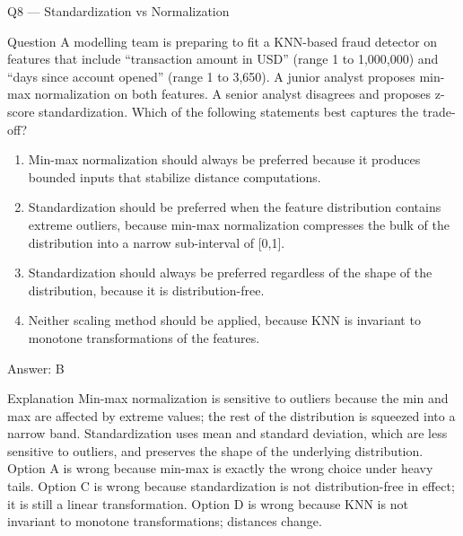 \documentclass[aspectratio=169,8pt]{beamer}
\begin{document}
	\begin{frame}{Q8 --- Standardization vs Normalization}
		\begin{block}{Question}
			A modelling team is preparing to fit a KNN-based fraud detector on features that include ``transaction amount in USD'' (range 1 to 1,000,000) and ``days since account opened'' (range 1 to 3,650). A junior analyst proposes min-max normalization on both features. A senior analyst disagrees and proposes z-score standardization. Which of the following statements best captures the trade-off?
		\end{block}
		\begin{enumerate}
			\item Min-max normalization should always be preferred because it produces bounded inputs that stabilize distance computations.
			\item Standardization should be preferred when the feature distribution contains extreme outliers, because min-max normalization compresses the bulk of the distribution into a narrow sub-interval of [0,1].
			\item Standardization should always be preferred regardless of the shape of the distribution, because it is distribution-free.
			\item Neither scaling method should be applied, because KNN is invariant to monotone transformations of the features.
		\end{enumerate}
		\begin{exampleblock}{Answer: B}\end{exampleblock}
		\begin{block}{Explanation}
			Min-max normalization is sensitive to outliers because the min and max are affected by extreme values; the rest of the distribution is squeezed into a narrow band. Standardization uses mean and standard deviation, which are less sensitive to outliers, and preserves the shape of the underlying distribution. Option A is wrong because min-max is exactly the wrong choice under heavy tails. Option C is wrong because standardization is not distribution-free in effect; it is still a linear transformation. Option D is wrong because KNN is not invariant to monotone transformations; distances change.
		\end{block}
	\end{frame}
	
\end{document}
